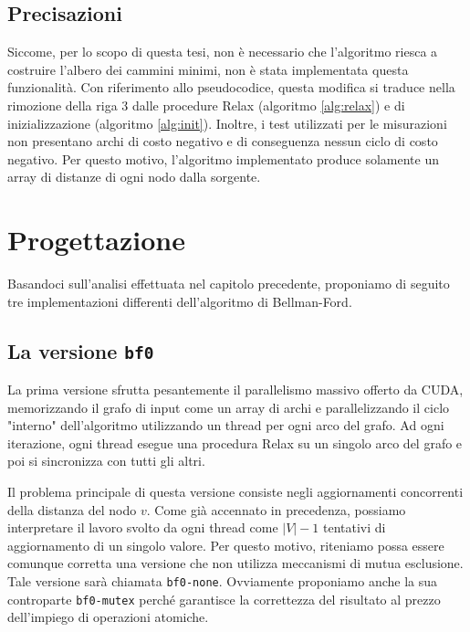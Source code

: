 \documentclass[12pt,a4paper,oneside]{book}
\begin{document}
	\section{Precisazioni}
	Siccome, per lo scopo di questa tesi, non è necessario che l'algoritmo riesca a costruire l'albero dei cammini minimi, non è stata implementata questa funzionalità. Con riferimento allo pseudocodice, questa modifica si traduce nella rimozione della riga 3 dalle procedure Relax (algoritmo \ref{alg:relax}) e di inizializzazione (algoritmo \ref{alg:init}). Inoltre, i test utilizzati per le misurazioni non presentano archi di costo negativo e di conseguenza nessun ciclo di costo negativo. Per questo motivo, l'algoritmo implementato produce solamente un array di distanze di ogni nodo dalla sorgente.
	
	\chapter{Progettazione}
	\label{chap:progettazione}
	Basandoci sull'analisi effettuata nel capitolo precedente, proponiamo di seguito tre implementazioni differenti dell'algoritmo di Bellman-Ford.
	
	\section{La versione \texttt{bf0}}
	La prima versione sfrutta pesantemente il parallelismo massivo offerto da CUDA, memorizzando il grafo di input come un array di archi e parallelizzando il ciclo "interno" dell'algoritmo utilizzando un thread per ogni arco del grafo. Ad ogni iterazione, ogni thread esegue una procedura Relax su un singolo arco del grafo e poi si sincronizza con tutti gli altri.
	
	Il problema principale di questa versione consiste negli aggiornamenti concorrenti della distanza del nodo $v$. Come già accennato in precedenza, possiamo interpretare il lavoro svolto da ogni thread come $|V|-1$ tentativi di aggiornamento di un singolo valore. Per questo motivo, riteniamo possa essere comunque corretta una versione che non utilizza meccanismi di mutua esclusione. Tale versione sarà chiamata \texttt{bf0-none}. Ovviamente proponiamo anche la sua controparte \texttt{bf0-mutex} perché garantisce la correttezza del risultato al prezzo dell'impiego di operazioni atomiche.
	
\end{document}
